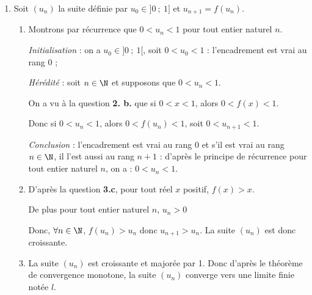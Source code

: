 \begin{enumerate}
\begin{enumerate}
$y=f'(1)(x-1)+f(1)$

		 Avec $f'(1)=1$ et $f(1)=1$, on en déduit l'équation de $(T)~:~y=x-1+1=x$, soit 

$M(x~;~y) \in (T) \iff y = x$.
		\item Nous savons que $\forall x \in ]0~;~+\infty[$, $f'(x)=\ln(x)+1$.

		La fonction $f'$  est continue et dérivable sur $]0~;~+\infty[$, et $f''(x)=\dfrac{1}{x}>0$, donc $f$ est convexe sur $]0~;~+\infty[$.
		\item La courbe représentative d'une fonction convexe est au-dessus de toutes ses tangentes. En particulier $\mathcal{C}_f$ est au-dessus de $(T)$. Donc $\forall x \in ]0~;~+\infty[$, $f(x)\geqslant x$.
	\end{enumerate}
	\item Soit $\left(u_n\right)$ la suite définie par $u_0 \in ]0~;~1]$ et $u_{n+1}=f(u_n)$.
	\begin{enumerate}
		\item Montrons par récurrence que $0 < u_n <1$ pour tout entier naturel $n$.
		
\emph{Initialisation} : on a $u_0 \in ]0~;~1[$, soit $0 < u_0 < 1$ : l'encadrement est vrai au rang $0$ ;

\emph{Hérédité} : soit $n \in \N$ et supposons que $0 < u_n < 1$.

On a vu à la question \textbf{2. b.} que si $0 < x < 1$, alors $0 < f(x) < 1$.

Donc si $0 < u_n < 1$, alors $0 < f\left(u_n\right) < 1$, soit $0 < u_{n+1} < 1$.

\emph{Conclusion} : l'encadrement est vrai au rang 0 et s'il est vrai au rang $n \in \N$, il l'est aussi au rang $n + 1$ : d'après le principe de récurrence pour tout entier naturel $n$, on a : $0 < u_n < 1$.
		
		\item D'après la question \textbf{3.c}, pour tout réel $x$ positif, $f(x)>x$.

De plus pour tout entier naturel $n$, $u_n>0$

Donc, $\forall n \in \N$, $f(u_n)>u_n$ donc $u_{n+1}>u_n$. La suite $\left(u_n\right)$ est donc croissante.
		 \item La suite $\left(u_n\right)$ est croissante et majorée par 1. Donc d'après le théorème de convergence monotone, la suite $\left(u_n\right)$ converge vers une limite finie notée $l$.
	\end{enumerate}
\end{enumerate}

\pagebreak

